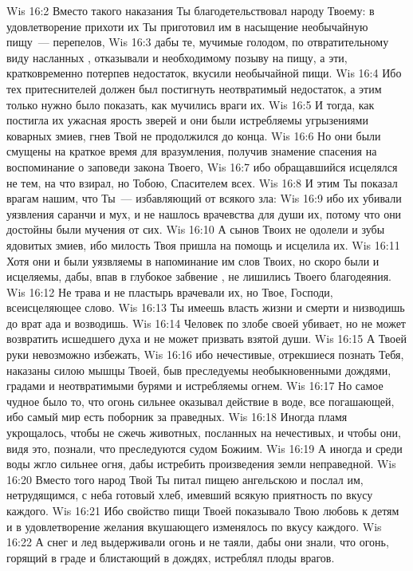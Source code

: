 \vs Wis 16:2 Вместо такого наказания Ты благодетельствовал народу Твоему: в удовлетворение прихоти их Ты приготовил им в насыщение необычайную пищу~--- перепелов,
\vs Wis 16:3 дабы те, мучимые голодом, по отвратительному виду насланных , отказывали и необходимому позыву на пищу, а эти, кратковременно потерпев недостаток, вкусили необычайной пищи.
\vs Wis 16:4 Ибо тех притеснителей должен был постигнуть неотвратимый недостаток, а этим только нужно было показать, как мучились враги их.
\vs Wis 16:5 И тогда, как постигла их ужасная ярость зверей и они были истребляемы угрызениями коварных змиев, гнев Твой не продолжился до конца.
\vs Wis 16:6 Но они были смущены на краткое время для вразумления, получив знамение спасения на воспоминание о заповеди закона Твоего,
\vs Wis 16:7 ибо обращавшийся исцелялся не тем, на что взирал, но Тобою, Спасителем всех.
\vs Wis 16:8 И этим Ты показал врагам нашим, что Ты~--- избавляющий от всякого зла:
\vs Wis 16:9 ибо их убивали уязвления саранчи и мух, и не нашлось врачевства для души их, потому что они достойны были мучения от сих.
\vs Wis 16:10 А сынов Твоих не одолели и зубы ядовитых змиев, ибо милость Твоя пришла на помощь и исцелила их.
\vs Wis 16:11 Хотя они и были уязвляемы в напоминание им слов Твоих, но скоро были и исцеляемы, дабы, впав в глубокое забвение , не лишились Твоего благодеяния.
\vs Wis 16:12 Не трава и не пластырь врачевали их, но Твое, Господи, всеисцеляющее слово.
\vs Wis 16:13 Ты имеешь власть жизни и смерти и низводишь до врат ада и возводишь.
\vs Wis 16:14 Человек по злобе своей убивает, но не может возвратить исшедшего духа и не может призвать взятой души.
\vs Wis 16:15 А Твоей руки невозможно избежать,
\vs Wis 16:16 ибо нечестивые, отрекшиеся познать Тебя, наказаны силою мышцы Твоей, быв преследуемы необыкновенными дождями, градами и неотвратимыми бурями и истребляемы огнем.
\vs Wis 16:17 Но самое чудное было то, что огонь сильнее оказывал действие в воде, все погашающей, ибо самый мир есть поборник за праведных.
\vs Wis 16:18 Иногда пламя укрощалось, чтобы не сжечь животных, посланных на нечестивых, и чтобы они, видя это, познали, что преследуются судом Божиим.
\vs Wis 16:19 А иногда и среди воды жгло сильнее огня, дабы истребить произведения земли неправедной.
\vs Wis 16:20 Вместо того народ Твой Ты питал пищею ангельскою и послал им, нетрудящимся, с неба готовый хлеб, имевший всякую приятность по вкусу каждого.
\vs Wis 16:21 Ибо свойство пищи Твоей показывало Твою любовь к детям и в удовлетворение желания вкушающего изменялось по вкусу каждого.
\vs Wis 16:22 А снег и лед выдерживали огонь и не таяли, дабы они знали, что огонь, горящий в граде и блистающий в дождях, истреблял плоды врагов.
